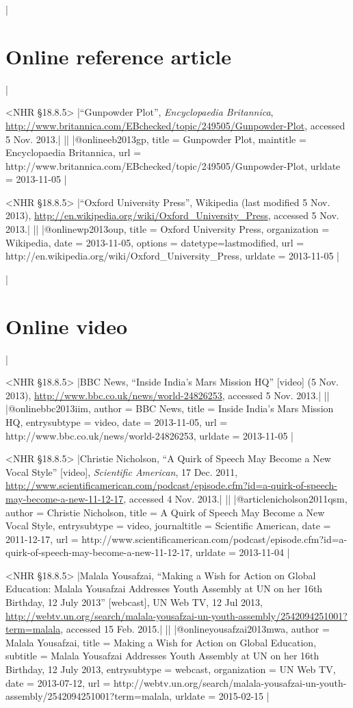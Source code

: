 \documentclass[extrafontsizes,11pt,a4paper,oneside]{memoir}
\begin{document}
\todoc|
\section{Online reference article}
|

\bibexample<NHR \S18.8.5>
|\enquote{Gunpowder Plot}, \emph{Encyclopaedia Britannica}, \url{http://www.britannica.com/EBchecked/topic/249505/Gunpowder-Plot}, accessed 5 Nov. 2013.|%
||%
|@online{eb2013gp,
  title = {Gunpowder Plot},
  maintitle = {Encyclopaedia Britannica},
  url = {http://www.britannica.com/EBchecked/topic/249505/Gunpowder-Plot},
  urldate = {2013-11-05}
}|

\bibexample<NHR \S18.8.5>
|\enquote{Oxford University Press}, Wikipedia (last modified 5 Nov. 2013), \url{http://en.wikipedia.org/wiki/Oxford_University_Press}, accessed 5 Nov. 2013.|%
||%
|@online{wp2013oup,
  title = {Oxford University Press},
  organization = {Wikipedia},
  date = {2013-11-05},
  options = {datetype=last{\space}modified},
  url = {http://en.wikipedia.org/wiki/Oxford_University_Press},
  urldate = {2013-11-05}
}|

\todoc|
\section{Online video}
|

\bibexample<NHR \S18.8.5>
|BBC News, \enquote{Inside India's Mars Mission HQ} [video] (5 Nov. 2013), \url{http://www.bbc.co.uk/news/world-24826253}, accessed 5 Nov. 2013.|%
||%
|@online{bbc2013iim,
  author = {{BBC News}},
  title = {Inside India's Mars Mission HQ},
  entrysubtype = {video},
  date = {2013-11-05},
  url = {http://www.bbc.co.uk/news/world-24826253},
  urldate = {2013-11-05}
}|

\bibexample<NHR \S18.8.5>
|Christie Nicholson, \enquote{A Quirk of Speech May Become a New Vocal Style} [video], \emph{Scientific American}, 17 Dec. 2011, \url{http://www.scientificamerican.com/podcast/episode.cfm?id=a-quirk-of-speech-may-become-a-new-11-12-17}, accessed 4 Nov. 2013.|%
||
|@article{nicholson2011qsm,
  author = {Christie Nicholson},
  title = {A Quirk of Speech May Become a New Vocal Style},
  entrysubtype = {video},
  journaltitle = {Scientific American},
  date = {2011-12-17},
  url = {http://www.scientificamerican.com/podcast/episode.cfm?id=a-quirk-of-speech-may-become-a-new-11-12-17},
  urldate = {2013-11-04}
}|

\bibexample<NHR \S18.8.5>
|Malala Yousafzai, \enquote{Making a Wish for Action on Global Education: Malala Yousafzai Addresses Youth Assembly at UN on her 16th Birthday, 12 July 2013} [webcast], UN Web TV, 12 Jul 2013, \url{http://webtv.un.org/search/malala-yousafzai-un-youth-assembly/2542094251001?term=malala}, accessed 15 Feb. 2015.|%
||%
|@online{yousafzai2013mwa,
  author = {Malala Yousafzai},
  title = {Making a Wish for Action on Global Education},
  subtitle = {Malala Yousafzai Addresses Youth Assembly at UN on her 16th Birthday, 12 July 2013},
  entrysubtype = {webcast},
  organization = {UN Web TV},
  date = {2013-07-12},
  url = {http://webtv.un.org/search/malala-yousafzai-un-youth-assembly/2542094251001?term=malala},
  urldate = {2015-02-15}
}|
\end{document}

